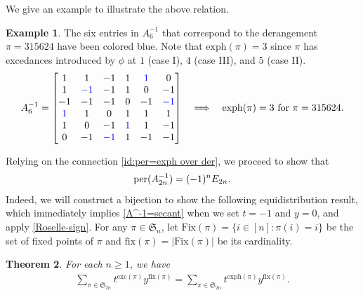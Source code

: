 \documentclass[11pt,reqno]{amsart}
\numberwithin{equation}{section}
\def\blue{\textcolor{blue}}
\theoremstyle{plain}
\newtheorem{theorem}{Theorem}[section]
\theoremstyle{definition}
\newtheorem{example}[theorem]{Example}
\renewcommand{\S}{\mathfrak{S}}
\def\exc{\mathrm{exc}}
\def\fix{\mathrm{fix}}
\def\Fix{\mathrm{Fix}}
\def\per{\mathrm{per}}
\def\exph{\mathrm{exph}}
\def\per{{\rm per}}
\begin{document}
We give an example to illustrate the above relation.
\begin{example}
The six entries in $A_6^{-1}$ that correspond to the derangement $\pi=315624$ have been colored blue. Note that $\exph(\pi)=3$ since $\pi$ has excedances introduced by $\phi$ at $1$ (case I), $4$ (case III), and $5$ (case II).
\begin{align*}
A_6^{-1}=\begin{bmatrix}
1 & 1 & -1 & 1 & \blue{1} & 0\\
1 & \blue{-1} & -1 & 1 & 0 & -1\\
-1 & -1 & -1 & 0 & -1 & \blue{-1}\\
\blue{1} & 1 & 0 & 1 & 1 & 1\\
1 & 0 & -1 & \blue{1} & 1 & -1\\
0 & -1 & \blue{-1} & 1 & -1 & -1
\end{bmatrix}
\quad \Longrightarrow
\quad  \exph(\pi)=3\ \text{for}\ \pi=315624.
\end{align*}
\end{example}

Relying on the connection \eqref{id:per=exph over der}, we proceed to show that
\begin{align}
\per(A^{-1}_{2n})=(-1)^nE_{2n}.
\label{A^-1=secant}
\end{align}
Indeed, we will construct a bijection to show the following equidistribution result, which immediately implies \eqref{A^-1=secant} when we set $t=-1$ and $y=0$, and apply \eqref{Roselle-sign}. For any $\pi\in\S_n$, let $\Fix(\pi)=\{i\in[n]:\pi(i)=i\}$ be the set of fixed points of $\pi$ and $\fix(\pi)=|\Fix(\pi)|$ be its cardinality.
\begin{theorem}\label{thm:bij for A^-1}
For each $n\ge 1$, we have
\begin{align}
\label{id:exph and fix}
\sum_{\pi\in\S_{2n}}t^{\exc(\pi)}y^{\fix(\pi)}=\sum_{\pi\in\S_{2n}}t^{\exph(\pi)}y^{\fix(\pi)}.
\end{align}
\end{theorem}
\end{document}
